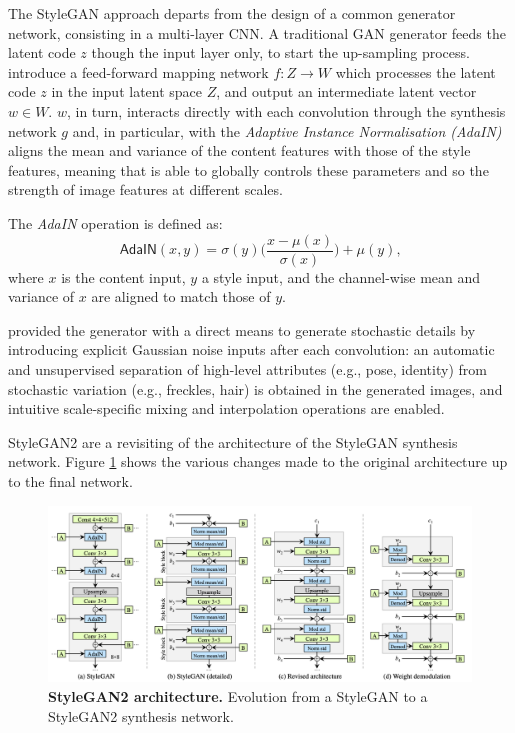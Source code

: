 \documentclass{article}
\begin{document}
	The StyleGAN approach departs from the design of a common generator network, consisting in a 
	multi-layer CNN.
	A traditional GAN generator feeds the latent code $z$ though the input layer only, to start the 
	up-sampling process.
	\citet{karras2019style} introduce a feed-forward mapping network $f : Z \rightarrow W$ which 
	processes the latent code $z$ in the input latent space $Z$, and output an intermediate latent 
	vector $w \in W$. 
	$w$, in turn, interacts directly with each convolution through the synthesis network  $g$ and, in 
	particular, with the \textit{Adaptive Instance Normalisation (AdaIN)} \cite{huang2017arbitrary} aligns 
	the mean and variance of the content features with those of the style features, meaning that is able 
	to globally controls these parameters and so the strength of image features at different scales. 
	
	The \textit{AdaIN} operation is defined as:
	\begin{equation}
		\label{e:adain}
		\mathsf{AdaIN}(x, y) = \sigma(y) \bigg(\frac{x - \mu(x)}{\sigma (x)} \bigg) + \mu (y) \mbox{,}
	\end{equation}
	where $x$ is the content input, $y$ a style input, and the channel-wise mean and variance of $x$ 
	are aligned to match those of $y$.
	
	\citet{karras2019style} provided the generator with a direct means to generate stochastic 
	details by 
	introducing explicit Gaussian noise inputs after each convolution: an automatic and 
	unsupervised 
	separation of high-level attributes (e.g., pose, identity) from stochastic variation (e.g., 
	freckles, hair) 
	is obtained in the generated images, and intuitive scale-specific mixing and interpolation 
	operations 
	are enabled.
	
	StyleGAN2 \cite{karras2020analyzing} are a revisiting of the architecture of the StyleGAN synthesis 
	network. Figure \ref{fig:styleGAN2} shows the various changes made to the original architecture up 
	to the final network.
	\begin{figure}[htb]				
		\centering
		\includegraphics[width=.9\linewidth]{images/styleGAN2}
		\caption{\textbf{StyleGAN2 architecture.} Evolution from a StyleGAN to a StyleGAN2 synthesis 
			network.}
		\label{fig:styleGAN2}
	\end{figure}
	
\end{document}
